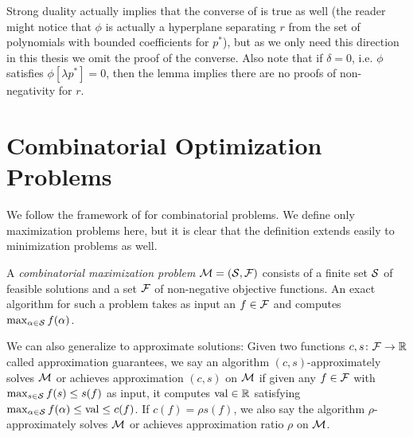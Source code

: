Strong duality actually implies that the converse of  is true as well (the reader might notice that $\phi$ is actually a hyperplane separating $r$ from the set of polynomials with bounded coefficients for $p^*$), but as we only need this direction in this thesis we omit the proof of the converse. Also note that if $\delta = 0$, i.e. $\phi$ satisfies $\phi[\lambda p^*] = 0$, then the lemma implies there are no proofs of non-negativity for $r$. 

\section{Combinatorial Optimization Problems}\label{sec:prelims_comb_opt}
We follow the framework of \cite{BPZ15} for combinatorial problems.
We define only maximization problems here, but it is clear that the definition extends easily to minimization problems as well.
\begin{definition}
A \emph{combinatorial maximization problem} \(\mathcal M = (\mathcal S, \mathcal F)\)
consists of a finite set
\(\mathcal S\) of feasible solutions and a set \(\mathcal F\) of non-negative
objective functions. An exact algorithm for such a problem takes as input an $f \in \mathcal F$ and computes
$\max_{\alpha \in \mathcal S} f(\alpha)$.

We can also generalize to approximate solutions: Given two functions \(c,s \colon \mathcal F \rightarrow \mathbb R\)
called approximation guarantees, we say
an algorithm \((c,s)\)-approximately solves \(\mathcal M\) or achieves approximation $(c,s)$ on $\mathcal M$
if given any \(f \in \mathcal F\) with \(\max_{s \in \mathcal S} f(s) \leq s(f)\) as input,
it computes \(\operatorname{val} \in \mathbb R\) satisfying
\(\max_{\alpha \in \mathcal S} f(\alpha) \leq \operatorname{val} \leq c(f)\).
If $c(f) = \rho s(f)$, we also say the algorithm $\rho$-approximately solves $\mathcal M$ or achieves approximation ratio $\rho$ on $\mathcal M$.
\end{definition}

